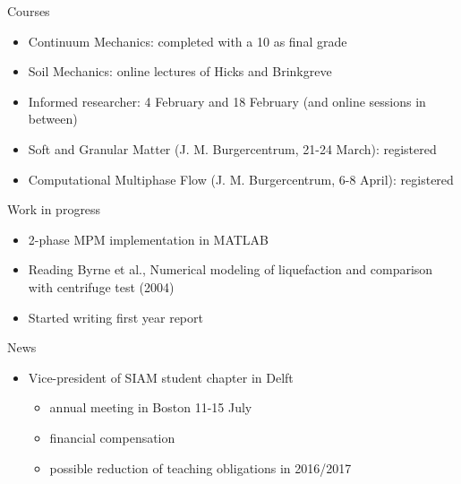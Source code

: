 \documentclass[mathserif,professionalfont,hyperref={pdfpagelabels=false}]{beamer}
\begin{document}
\begin{frame}{Courses}
\begin{itemize}
\item Continuum Mechanics: completed with a 10 as final grade
\pause
\item Soil Mechanics: online lectures of Hicks and Brinkgreve
\pause
\item Informed researcher: 4 February and 18 February (and online sessions in between)
\pause
\item Soft and Granular Matter (J. M. Burgercentrum, 21-24 March): registered
\pause
\item Computational Multiphase Flow (J. M. Burgercentrum, 6-8 April): registered
\end{itemize}
\end{frame}


\begin{frame}{Work in progress}
\begin{itemize}
\item 2-phase MPM implementation in MATLAB
\item Reading Byrne et al., Numerical modeling of liquefaction and comparison with centrifuge test (2004)
\item Started writing first year report 
\end{itemize}
\end{frame}

\begin{frame}{News}
\begin{itemize}
\item Vice-president of SIAM student chapter in Delft
\begin{itemize}
\item annual meeting in Boston 11-15 July
\item financial compensation 
\item possible reduction of teaching obligations in 2016/2017
\end{itemize}
\end{itemize}
\end{frame}

\end{document}

